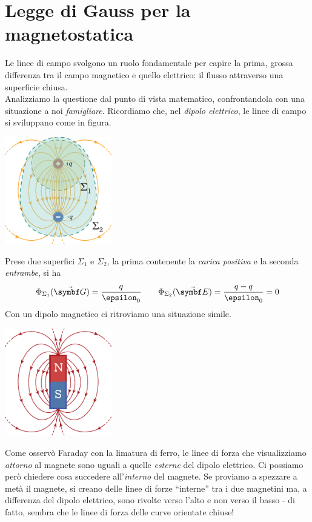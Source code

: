 \section{Legge di Gauss per la magnetostatica}
Le linee di campo svolgono un ruolo fondamentale per capire la prima, grossa differenza tra il campo magnetico e quello elettrico: il flusso attraverso una superficie chiusa.\\
Analizziamo la questione dal punto di vista matematico, confrontandola con una situazione a noi \textit{famigliare}. Ricordiamo che, nel \textit{dipolo elettrico}, le linee di campo si sviluppano come in figura.
\begin{center}
	\includegraphics[width=0.35\textwidth]{images/chp7/chp7leggegaussmagneti1.pdf}
\end{center}
Prese due superfici $\Sigma_1$ e $\Sigma_2$, la prima contenente la \textit{carica positiva} e la seconda \textit{entrambe}, si ha
\begin{equation*}
	\Phi_{\Sigma_1}(\vba{G})=\frac{q}{\epsilon_0}\qquad\Phi_{\Sigma_2}(\vba{E})=\frac{q-q}{\epsilon_0}=0
\end{equation*}
Con un dipolo magnetico ci ritroviamo una situazione simile.
\begin{center}
	\includegraphics[width=0.35\textwidth]{images/chp7/chp7leggegaussmagneti2.pdf}
\end{center}
Come osservò Faraday con la limatura di ferro, le linee di forza che visualizziamo \textit{attorno} al magnete sono uguali a quelle \textit{esterne} del dipolo elettrico. Ci possiamo però chiedere cosa succedere all'\textit{interno} del magnete. Se proviamo a spezzare a metà il magnete, si creano delle linee di forze ``interne'' tra i due magnetini ma, a differenza del dipolo elettrico, sono rivolte verso l'alto e non verso il basso - di fatto, sembra che le linee di forza delle curve orientate chiuse!
